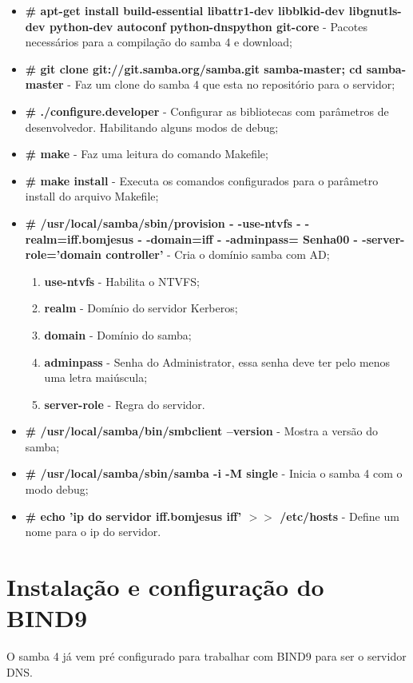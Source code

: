 \begin{itemize}
	\item \textbf{\# apt-get install build-essential libattr1-dev libblkid-dev libgnutls-dev python-dev autoconf python-dnspython git-core} - Pacotes necessários para a compilação do samba 4 e download;
	\item \textbf{\# git clone git://git.samba.org/samba.git samba-master; cd samba-master} - Faz um clone do samba 4 que esta no repositório para o servidor;
	\item \textbf{\# ./configure.developer} - Configurar as bibliotecas com parâmetros de desenvolvedor. Habilitando alguns modos de debug;
	\item \textbf{\# make} - Faz uma leitura do comando Makefile;
	\item \textbf{\# make install} - Executa os comandos configurados para o parâmetro install do arquivo Makefile;
	\item \textbf{\# /usr/local/samba/sbin/provision - -use-ntvfs - -realm=iff.bomjesus - -domain=iff  - -adminpass= Senha00 - -server-role='domain controller'} - Cria o domínio samba com AD;
		\begin{enumerate}
			\item \textbf{use-ntvfs} - Habilita o NTVFS;
			\item \textbf{realm} - Domínio do servidor Kerberos;
			\item \textbf{domain} - Domínio do samba;
			\item \textbf{adminpass} - Senha do Administrator, essa senha deve ter pelo menos uma letra maiúscula;
			\item \textbf{server-role} - Regra do servidor.
		\end{enumerate}
	\item \textbf{\# /usr/local/samba/bin/smbclient --version} - Mostra a versão do samba;
	\item \textbf{\# /usr/local/samba/sbin/samba -i -M single} - Inicia o samba 4 com o modo debug;
	\item \textbf{\#  echo 'ip do servidor iff.bomjesus iff' $>$$>$ /etc/hosts} - Define um nome para o ip do servidor.
\end{itemize}

\section{Instalação e configuração do BIND9}

O samba 4 já vem pré configurado para trabalhar com BIND9 para ser o servidor DNS.

